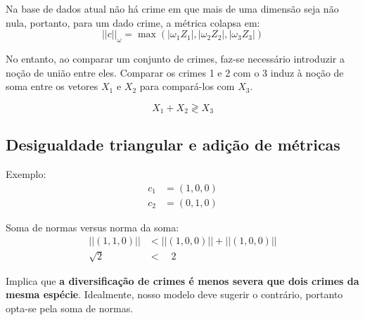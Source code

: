 \documentclass[12pt, a4paper]{article}
\begin{document}
Na base de dados atual não há crime em que mais de uma dimensão seja não nula, portanto, para um dado crime, a métrica colapsa em:
\[
    || c ||_\omega = \max (|\omega_1 Z_1| , | \omega_2 Z_2|, |\omega_3 Z_3|)
\]

No entanto, ao comparar um conjunto de crimes, faz-se necessário introduzir a noção de união entre eles. Comparar os crimes 1 e 2 com o 3 induz à noção de soma entre os vetores \( X_1 \) e \( X_2 \) para compará-los com \( X_3 \).

\[ X_1 + X_2 \gtrless X_3 \]

\subsection{Desigualdade triangular e adição de métricas}%
Exemplo:
\begin{align*}
    c_1 &= (1, 0, 0) \\
    c_2 &= (0, 1, 0)
\end{align*}

Soma de normas versus norma da soma:
\begin{align*}
    || (1, 1, 0) || &< || (1, 0, 0) || + || (1, 0, 0) || \\
    \sqrt{2} \quad &< \quad 2
\end{align*}

Implica que \textbf{a diversificação de crimes é menos severa que dois crimes da mesma espécie}. Idealmente, nosso modelo deve sugerir o contrário, portanto opta-se pela soma de normas.
\end{document}
